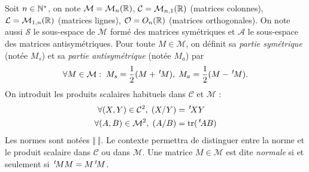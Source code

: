 Soit $n \in \mathbb{N}^*$, on note $\mathcal{M} = \mathcal{M}_n(\mathbb{R})$, $\mathcal{C} = \mathcal{M}_{n,1}(\mathbb{R})$ (matrices colonnes), $\mathcal{L} = \mathcal{M}_{1,n}(\mathbb{R})$ (matrices lignes), $\mathcal{O} = O_n(\mathbb{R})$ (matrices orthogonales).\newline 
On note aussi $\mathcal{S}$ le sous-espace de $\mathcal{M}$ formé des matrices symétriques et $\mathcal{A}$ le sous-espace des matrices antisymétriques.\newline
Pour toute $M\in \mathcal{M}$, on définit sa \emph{partie symétrique} (notée $M_s$) et sa \emph{partie antisymétrique} (notée $M_a$) par
\[
 \forall M \in \mathcal{M}: \; M_s = \frac{1}{2}(M + \,\mathstrut^t\!{M}), \;M_a = \frac{1}{2}(M - \,\mathstrut^t\!{M}).
\]
On introduit les produits scalaires habituels dans $\mathcal{C}$ et $\mathcal{M}$ :
\[
\begin{aligned}
\forall (X,Y) \in \mathcal{C}^2, \; (X/Y) &= \,\mathstrut^t\!{X} Y \\ 
\forall (A,B) \in \mathcal{M}^2, \; (A/B) &= \operatorname{tr}(\,\mathstrut^t\!{A} B)
\end{aligned}
\]
Les normes sont notées $\Vert \:\Vert$. Le contexte permettra de distinguer entre la norme et le produit scalaire dans $\mathcal{C}$ ou dans $\mathcal{M}$.\newline
Une matrice $M\in \mathcal{M}$ est dite \emph{normale} si et seulement si $\,\mathstrut^t\!{M} M = M \,\mathstrut^t\!{M}$.
